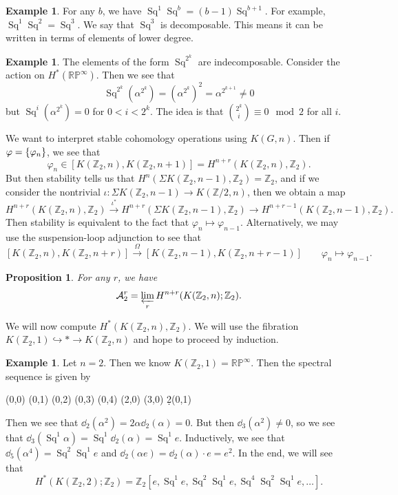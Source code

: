 \documentclass[leqno, openany]{memoir}
\newtheorem{prop}[thm]{Proposition}
\theoremstyle{definition}
\newtheorem{exm}[thm]{Example}
\theoremstyle{remark}
\theoremstyle{plain}
\theoremstyle{definition}
\theoremstyle{remark}
\newcommand{\R}{\mathbb{R}}
\newcommand{\Z}{\mathbb{Z}}
\renewcommand{\P}{\mathbb{P}}
\newcommand{\mc}[1]{\mathcal{#1}}
\DeclareMathOperator{\Sq}{Sq}
\begin{document}
\begin{exm}
    For any $b$, we have $\Sq^1 \Sq^b = (b-1) \Sq^{b+1}$. For example, $\Sq^1 \Sq^2 = \Sq^3$. We say that $\Sq^3$ is decomposable. This means it can be written in terms of elements of lower degree.
\end{exm}

\begin{exm}
    The elements of the form $\Sq^{2^k}$ are indecomposable. Consider the action on $H^*(\R\P^{\infty})$. Then we see that
    \[ \Sq^{2^k}(\alpha^{2^k}) = {(\alpha^{2^k})}^2 = \alpha^{2^{k+1}} \neq 0 \]
    but $\Sq^i (\alpha^{2^k})=  0$ for $0 < i < 2^k$. The idea is that $\binom{2^k}{i} \equiv 0 \mod 2$ for all $i$.
\end{exm}

We want to interpret stable cohomology operations using $K(G, n)$. Then if $\varphi = \qty{\varphi_n}$, we see that
\[ \varphi_n \in [K(\Z_2, n),K(\Z_2, n+1)] = H^{n+r}(K(\Z_2, n), \Z_2). \]
But then stability tells us that $H^n(\Sigma K(\Z_2, n-1), \Z_2) = \Z_2$, and if we consider the nontrivial $\iota \colon \Sigma K(\Z_2, n-1) \to K(\Z/2, n)$, then we obtain a map
\[ H^{n+r}(K(\Z_2, n), \Z_2) \xrightarrow{\iota^*} H^{n+r}(\Sigma K(\Z_2, n-1), \Z_2) \to H^{n+r-1}(K(\Z_2, n-1), \Z_2). \]
Then stability is equivalent to the fact that $\varphi_n \mapsto \varphi_{n-1}$. Alternatively, we may use the suspension-loop adjunction to see that
\[ [K(\Z_2, n), K(\Z_2, n+r)] \xrightarrow{\Omega} [K(\Z_2, n-1), K(\Z_2, n+r-1)] \qquad \varphi_n \mapsto \varphi_{n-1}. \]

\begin{prop}
    For any $r$, we have 
    \[ \mc{A}_2^r = \varprojlim_{r} H^{n+r}(K(\Z_2, n); \Z_2). \]
\end{prop}

We will now compute $H^*(K(\Z_2, n), \Z_2)$. We will use the fibration $K(\Z_2, 1) \hookrightarrow * \to K(\Z_2, n)$ and hope to proceed by induction.

\begin{exm}
    Let $n = 2$. Then we know $K(\Z_2, 1) = \R \P^{\infty}$. Then the spectral sequence is given by
    \begin{center}
        \begin{sseqdata}[classes={draw=none}, name=kz22, cohomological Serre grading]
            \class["1"](0,0)
            \class["\alpha"](0,1)
            \class["\alpha^2"](0,2)
            \class["\alpha^3"](0,3)
            \class["\alpha^2"](0,4)
            \class["e"](2,0)
            \class["\Sq^1 e"](3,0)
            \d2(0,1)
        \end{sseqdata}
        \printpage[name=kz22, page=2]
    \end{center}
    Then we see that $\dd_2(\alpha^2) = 2 \alpha \dd_2(\alpha) = 0$. But then $\dd_3(\alpha^2) \neq 0$, so we see that $\dd_3(\Sq^1 \alpha) = \Sq^1 \dd_2(\alpha) = \Sq^1 e$. Inductively, we see that $\dd_5(\alpha^4) = \Sq^2 \Sq^1 e$ and $\dd_2(\alpha e) = \dd_2 (\alpha) \cdot e = e^2$. In the end, we will see that
    \[ H^*(K(\Z_2, 2); \Z_2) = \Z_2 [ e, \Sq^1 e, \Sq^2 \Sq^1 e, \Sq^4 \Sq^2 \Sq^1 e, \ldots ]. \]
\end{exm}
\end{document}
